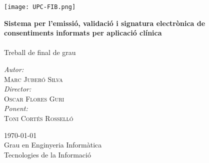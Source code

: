 \begin{titlepage}
\center

\texttt{[image: UPC-FIB.png]}
\vspace{2cm}


{\huge \bfseries Sistema per l'emissió, validació i signatura electrònica de consentiments informats per aplicació clínica}\\[0.4cm]
\HRule \\[0.2cm]


\Large Treball de final de grau

\vspace{5cm}

\emph{Autor:}\\ \large
 \textsc{Marc Juberó Silva}\\
\vspace{0.5cm}
\emph{Director:}\\ \large
 \textsc{Oscar Flores Guri}\\
\vspace{0.5cm}
\emph{Ponent:}\\ \large
 \textsc{Toni Cortés Rosselló}\\

\vfill


{\large \today}\\ %
\vspace{1cm}
Grau en Enginyeria Informàtica\\
Tecnologies de la Informació\\
\end{titlepage}